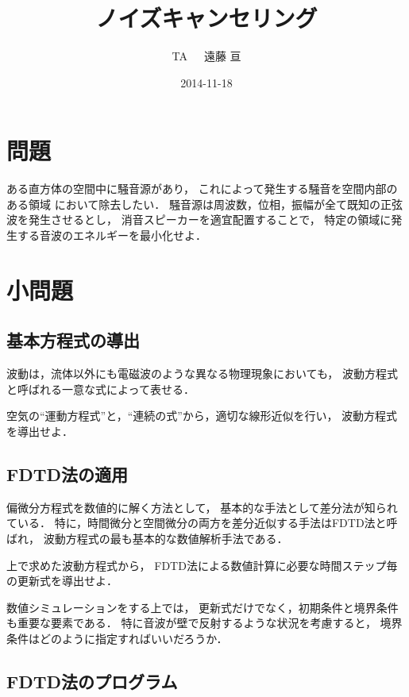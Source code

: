 


\title{ノイズキャンセリング}
\author{TA~~~遠藤 亘}
\date{2014-11-18}



\maketitle

\section{問題}

ある直方体の空間中に騒音源があり，
これによって発生する騒音を空間内部のある領域
において除去したい．
騒音源は周波数，位相，振幅が全て既知の正弦波を発生させるとし，
消音スピーカーを適宜配置することで，
特定の領域に発生する音波のエネルギーを最小化せよ．

\section{小問題}

\subsection{基本方程式の導出}

波動は，流体以外にも電磁波のような異なる物理現象においても，
波動方程式と呼ばれる一意な式によって表せる．

空気の``運動方程式''と，``連続の式''から，適切な線形近似を行い，
波動方程式を導出せよ．

\subsection{FDTD法の適用}

偏微分方程式を数値的に解く方法として，
基本的な手法として差分法が知られている．
特に，時間微分と空間微分の両方を差分近似する手法はFDTD法と呼ばれ，
波動方程式の最も基本的な数値解析手法である．

上で求めた波動方程式から，
FDTD法による数値計算に必要な時間ステップ毎の更新式を導出せよ．

数値シミュレーションをする上では，
更新式だけでなく，初期条件と境界条件も重要な要素である．
特に音波が壁で反射するような状況を考慮すると，
境界条件はどのように指定すればいいだろうか．

\subsection{FDTD法のプログラム}

